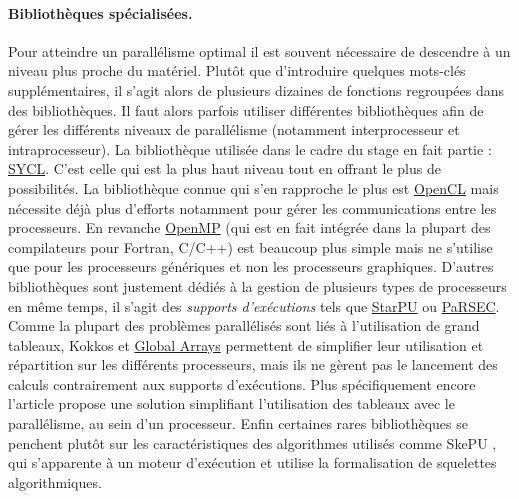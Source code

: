 \paragraph{Bibliothèques spécialisées.}
Pour atteindre un parallélisme optimal il est souvent nécessaire de descendre à un niveau plus proche du matériel. Plutôt que d'introduire quelques mots-clés supplémentaires, il s'agit alors de plusieurs dizaines de fonctions regroupées dans des bibliothèques. Il faut alors parfois utiliser différentes bibliothèques afin de gérer les différents niveaux de parallélisme (notamment interprocesseur et intraprocesseur). La bibliothèque utilisée dans le cadre du stage en fait partie : \textsf{\href{https://www.khronos.org/sycl}{SYCL}}. C'est celle qui est la plus haut niveau tout en offrant le plus de possibilités. La bibliothèque connue qui s'en rapproche le plus est \textsf{\href{https://www.khronos.org/opencl/}{OpenCL}} mais nécessite déjà plus d'efforts notamment pour gérer les communications entre les processeurs. En revanche \textsf{\href{http://openmp.org/wp/}{OpenMP}} (qui est en fait intégrée dans la plupart des compilateurs pour \textsf{Fortran}, \textsf{C/C++}) est beaucoup plus simple mais ne s'utilise que pour les processeurs génériques et non les processeurs graphiques. D'autres bibliothèques sont justement dédiés à la gestion de plusieurs types de processeurs en même temps, il s'agit des \emph{supports d'exécutions} tels que \textsf{\href{http://starpu.gforge.inria.fr/}{StarPU}} ou \textsf{\href{http://icl.utk.edu/parsec/}{PaRSEC}}. Comme la plupart des problèmes parallélisés sont liés à l'utilisation de grand tableaux, \textsf{Kokkos} \cite{Web5} et \textsf{\href{http://hpc.pnl.gov/globalarrays/}{Global Arrays}} permettent de simplifier leur utilisation et répartition sur les différents processeurs, mais ils ne gèrent pas le lancement des calculs contrairement aux supports d'exécutions. Plus spécifiquement encore l'article \cite{Art2} propose une solution simplifiant l'utilisation des tableaux avec le parallélisme, au sein d'un processeur. Enfin certaines rares bibliothèques se penchent plutôt sur les caractéristiques des algorithmes utilisés comme \textsf{SkePU} \cite{MstThs1}, qui s'apparente à un moteur d'exécution et utilise la formalisation de squelettes algorithmiques.


